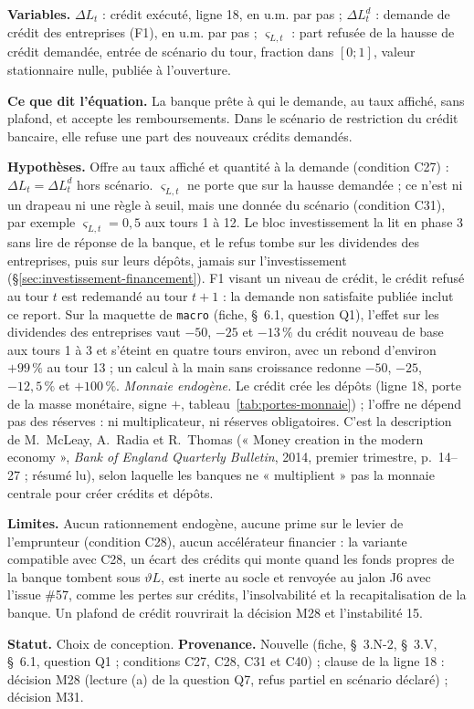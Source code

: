 \documentclass[11pt,a4paper]{article}
\newcommand{\variables}{\par\noindent\textbf{Variables.} }
\newcommand{\sens}{\par\noindent\textbf{Ce que dit l'équation.} }
\newcommand{\hyp}{\par\noindent\textbf{Hypothèses.} }
\newcommand{\limites}{\par\noindent\textbf{Limites.} }
\begin{document}
\begin{proposee}
\variables $\Delta L_t$ : crédit exécuté, ligne 18, en u.m. par pas ; $\Delta L^d_t$ : demande de crédit des entreprises (F1), en u.m. par pas ; $\varsigma_{L,t}$ : part refusée de la hausse de crédit demandée, entrée de scénario du tour, fraction dans $[0 ; 1]$, valeur stationnaire nulle, publiée à l'ouverture.
\sens La banque prête à qui le demande, au taux affiché, sans plafond, et accepte les remboursements. Dans le scénario de restriction du crédit bancaire, elle refuse une part des nouveaux crédits demandés.
\hyp Offre au taux affiché et quantité à la demande (condition C27) : $\Delta L_t = \Delta L^d_t$ hors scénario. $\varsigma_{L,t}$ ne porte que sur la hausse demandée ; ce n'est ni un drapeau ni une règle à seuil, mais une donnée du scénario (condition C31), par exemple $\varsigma_{L,t} = 0{,}5$ aux tours 1 à 12. Le bloc investissement la lit en phase 3 sans lire de réponse de la banque, et le refus tombe sur les dividendes des entreprises, puis sur leurs dépôts, jamais sur l'investissement (\S\ref{sec:investissement-financement}). F1 visant un niveau de crédit, le crédit refusé au tour $t$ est redemandé au tour $t + 1$ : la demande non satisfaite publiée inclut ce report. Sur la maquette de \texttt{macro} (fiche, \S~6.1, question Q1), l'effet sur les dividendes des entreprises vaut $-50$, $-25$ et $-13\,\%$ du crédit nouveau de base aux tours 1 à 3 et s'éteint en quatre tours environ, avec un rebond d'environ $+99\,\%$ au tour 13 ; un calcul à la main sans croissance redonne $-50$, $-25$, $-12{,}5\,\%$ et $+100\,\%$. \emph{Monnaie endogène.} Le crédit crée les dépôts (ligne 18, porte de la masse monétaire, signe $+$, tableau~\ref{tab:portes-monnaie}) ; l'offre ne dépend pas des réserves : ni multiplicateur, ni réserves obligatoires. C'est la description de M.~McLeay, A.~Radia et R.~Thomas (« Money creation in the modern economy », \emph{Bank of England Quarterly Bulletin}, 2014, premier trimestre, p.~14--27 ; résumé lu), selon laquelle les banques ne « multiplient » pas la monnaie centrale pour créer crédits et dépôts.
\limites Aucun rationnement endogène, aucune prime sur le levier de l'emprunteur (condition C28), aucun accélérateur financier : la variante compatible avec C28, un écart des crédits qui monte quand les fonds propres de la banque tombent sous $\vartheta L$, est inerte au socle et renvoyée au jalon J6 avec l'issue \#57, comme les pertes sur crédits, l'insolvabilité et la recapitalisation de la banque. Un plafond de crédit rouvrirait la décision M28 et l'instabilité 15.

\textbf{Statut.} Choix de conception. \textbf{Provenance.} Nouvelle (fiche, \S~3.N-2, \S~3.V, \S~6.1, question Q1 ; conditions C27, C28, C31 et C40) ; clause de la ligne 18 : décision M28 (lecture (a) de la question Q7, refus partiel en scénario déclaré) ; décision M31.
\end{proposee}
\end{document}
